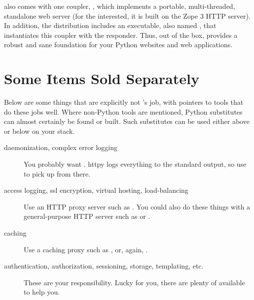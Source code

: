  also comes with one coupler, , which implements
a portable, multi-threaded, standalone web server (for the interested, it is
built on the Zope 3 HTTP server). In addition, the  distribution
includes an executable, also named , that instantiates this
 coupler with the  responder. Thus, out of the
box,  provides a robust and sane foundation for your Python
websites and web applications.


\section{Some Items Sold Separately}

Below are some things that are explicitly not 's job, with
pointers to tools that do these jobs well. Where non-Python tools are mentioned,
Python substitutes can almost certainly be found or built. Such substitutes can
be used either above or below  on your stack.

\begin{description}

\item[daemonization, complex error logging]
    {You probably want . httpy logs everything to the
    standard output, so use
     to pick up from
    there.}

\item[access logging, ssl encryption, virtual hosting, load-balancing]
    {Use an HTTP proxy server such as .
    You could also do these things with a general-purpose HTTP server such as
     or
    .}

\item[caching]
    {Use a caching proxy such as , or,
    again, .}

\item[authentication, authorization, sessioning, storage, templating, etc.]
    {These are your responsibility. Lucky for you, there are plenty of
     available to help
    you.}

\end{description}
